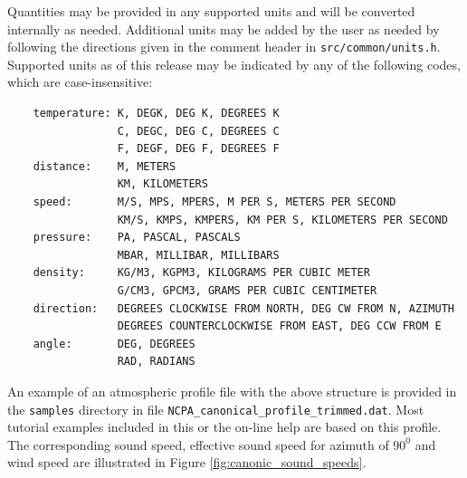 Quantities may be provided in any supported units and will be converted internally as needed.  Additional units may be added by the user as needed by following the directions given in the comment header in \verb"src/common/units.h".  Supported units as of this release may be indicated by any of the following codes, which are case-insensitive:
\begin{verbatim}
    temperature: K, DEGK, DEG K, DEGREES K
                 C, DEGC, DEG C, DEGREES C
                 F, DEGF, DEG F, DEGREES F
    distance:    M, METERS
                 KM, KILOMETERS
    speed:       M/S, MPS, MPERS, M PER S, METERS PER SECOND
                 KM/S, KMPS, KMPERS, KM PER S, KILOMETERS PER SECOND
    pressure:    PA, PASCAL, PASCALS
                 MBAR, MILLIBAR, MILLIBARS
    density:     KG/M3, KGPM3, KILOGRAMS PER CUBIC METER
                 G/CM3, GPCM3, GRAMS PER CUBIC CENTIMETER
    direction:   DEGREES CLOCKWISE FROM NORTH, DEG CW FROM N, AZIMUTH
                 DEGREES COUNTERCLOCKWISE FROM EAST, DEG CCW FROM E
    angle:       DEG, DEGREES
                 RAD, RADIANS
\end{verbatim}

An example of an atmospheric profile file with the above structure is provided in the \verb"samples" directory in file \verb"NCPA_canonical_profile_trimmed.dat". Most tutorial examples included in this or the on-line help are based on this profile. The corresponding sound speed, effective sound speed for azimuth of $90^0$ and wind speed are illustrated in Figure \ref{fig:canonic_sound_speeds}.

